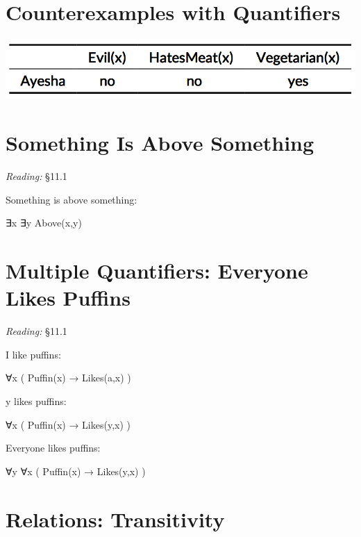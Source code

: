\documentclass[12pt]{extarticle}
\begin{document}
\begin{multicols*}{3}
 
\section{Counterexamples with Quantifiers}
 
\begin{center}
\includegraphics[scale=0.3]{img/unit_502b_counterexample.png}
\end{center}
 
 
\section{Something Is Above Something}
 
\emph{Reading:} §11.1
 
\begin{minipage}{\columnwidth}
 
Something is above something:
 
\hspace{3mm} ∃x ∃y Above(x,y)
 
\end{minipage}
 
 
 
\section{Multiple Quantifiers: Everyone Likes Puffins}
 
\emph{Reading:} §11.1
 
I like puffins:
 
\hspace{3mm} ∀x ( Puffin(x) → Likes(a,x) )
 
y likes puffins:
 
\hspace{3mm} ∀x ( Puffin(x) → Likes(y,x) )
 
Everyone likes puffins:
 
\hspace{3mm} ∀y ∀x ( Puffin(x) → Likes(y,x) )
 
 
 
\section{Relations: Transitivity}
 

\end{multicols*}
\end{document}
